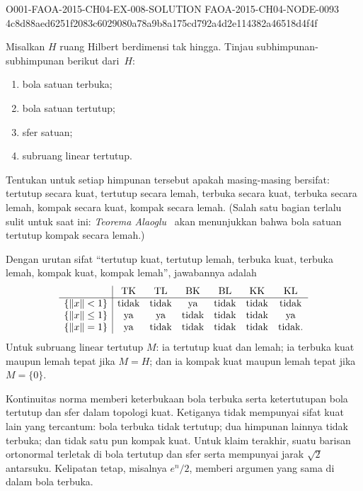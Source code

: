 \begin{o001solution}
  {O001-FAOA-2015-CH04-EX-008-SOLUTION}
  {FAOA-2015-CH04-NODE-0093}
  {4c8d88aed6251f2083c6029080a78a9b8a175cd792a4d2e114382a46518d4f4f}
\begin{o001statement}
Misalkan $H$ ruang Hilbert berdimensi tak hingga. Tinjau subhimpunan-subhimpunan berikut dari~$H$:
 \begin{enumerate}[label=\rm{(\alph*)}]
  \item bola satuan terbuka;
  \item bola satuan tertutup;
  \item sfer satuan;
  \item subruang linear tertutup.
 \end{enumerate}
Tentukan untuk setiap himpunan tersebut apakah masing-masing bersifat: tertutup secara kuat, tertutup secara lemah,
terbuka secara kuat, terbuka secara lemah, kompak secara kuat, kompak secara lemah. (Salah satu bagian
terlalu sulit untuk saat ini: \emph{Teorema Alaoglu}~ akan menunjukkan bahwa
bola satuan tertutup kompak secara lemah.)
\end{o001statement}
\begin{o001answer}
Dengan urutan sifat ``tertutup kuat, tertutup lemah, terbuka kuat, terbuka
lemah, kompak kuat, kompak lemah'', jawabannya adalah
\[
\begin{array}{c|cccccc}
 &\mathrm{TK}&\mathrm{TL}&\mathrm{BK}&\mathrm{BL}&\mathrm{KK}&\mathrm{KL}\\ \hline
\{\lVert x\rVert<1\}&\text{tidak}&\text{tidak}&\text{ya}&\text{tidak}&\text{tidak}&\text{tidak}\\
\{\lVert x\rVert\leq1\}&\text{ya}&\text{ya}&\text{tidak}&\text{tidak}&\text{tidak}&\text{ya}\\
\{\lVert x\rVert=1\}&\text{ya}&\text{tidak}&\text{tidak}&\text{tidak}&\text{tidak}&\text{tidak}.
\end{array}
\]
Untuk subruang linear tertutup $M$: ia tertutup kuat dan lemah; ia terbuka
kuat maupun lemah tepat jika $M=H$; dan ia kompak kuat maupun lemah tepat
jika $M=\{0\}$.
\end{o001answer}
\begin{o001proof}
Kontinuitas norma memberi keterbukaan bola terbuka serta ketertutupan bola
tertutup dan sfer dalam topologi kuat. Ketiganya tidak mempunyai sifat kuat
lain yang tercantum: bola terbuka tidak tertutup; dua himpunan lainnya tidak
terbuka; dan tidak satu pun kompak kuat. Untuk klaim terakhir, suatu barisan
ortonormal terletak di bola tertutup dan sfer serta mempunyai jarak
$\sqrt2$ antarsuku. Kelipatan tetap, misalnya $e^n/2$, memberi argumen yang
sama di dalam bola terbuka.


\end{o001proof}
\end{o001solution}
